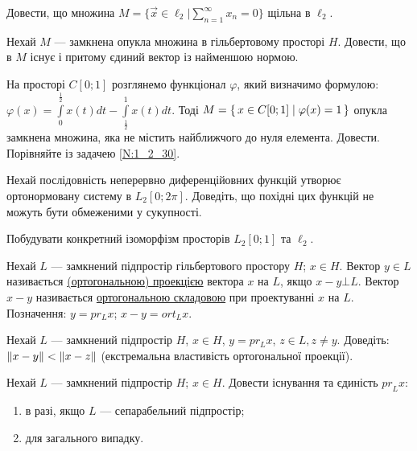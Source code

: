 
\begin{exercise}
    Довести, що множина $M = \{ \vec{x} \in \ell_2 | \sum\limits_{n = 1}^{\infty}x_n = 0\}$
    щільна в $\ell_2$.
\end{exercise}

\begin{exercise}\label{N:1_2_30}
    Нехай $M$ --- замкнена опукла множина в гільбертовому просторі $H$. Довести, що в $M$
    існує і притому єдиний вектор із найменшою нормою.
\end{exercise}

\begin{exercise}
    На просторі $C[0;1]$ розглянемо функціонал $\varphi$, який визначимо формулою: 
    $\varphi(x) = \int\limits_{0}^{\frac{1}{2}}x(t)dt - \int\limits_{\frac{1}{2}}^{1}x(t)dt$. Тоді
    $M = \set{x \in C[0; 1] \mid \varphi(x) = 1}$ опукла замкнена множина, яка не містить найближчого до 
    нуля елемента. Довести. Порівняйте із задачею \ref{N:1_2_30}.
\end{exercise}

\begin{exercise}\label{N:1_2_32}
    Нехай послідовність неперервно диференційовних функцій утворює ортонормовану систему
    в $L_2[0; 2\pi]$. Доведіть, що похідні цих функцій не можуть бути обмеженими у сукупності.
\end{exercise}

\begin{exercise}
    Побудувати конкретний ізоморфізм просторів $L_2[0;1]$ та $\ell_2$.
\end{exercise}

\begin{theory}
    Нехай $L$ --- замкнений підпростір гільбертового простору $H$; $x \in H$. Вектор
    $y \in L$ називається \uline{(ортогональною) проекцією} вектора $x$ на $L$, якщо
    $x - y \bot L$. Вектор $x - y$ називається \uline{ортогональною складовою} при
    проектуванні $x$ на $L$. Позначення: $y = pr_L x$; $x - y = ort_L x$.
\end{theory}

\begin{exercise}
    Нехай $L$ --- замкнений підпростір $H$, $x \in H$, $y = pr_L x$, $z \in L, z \neq y$.
    Доведіть: $\left\lVert x - y\right\rVert < \left\lVert x - z\right\rVert$ (екстремальна властивість ортогональної проекції).
\end{exercise}

\begin{exercise}
    Нехай $L$ --- замкнений підпростір $H$; $x \in H$. Довести існування та єдиність ${pr}_L x$:
    \begin{enumerate}[label=\ukr*)]
        \item в разі, якщо $L$ --- сепарабельний підпростір;
        \item для загального випадку.
    \end{enumerate}
\end{exercise}

